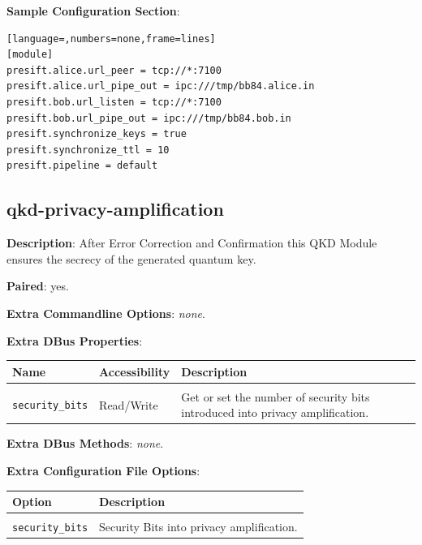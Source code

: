 \bigskip

\noindent \textbf{Sample Configuration Section}: 

\medskip

\begin{lstlisting}[language=,numbers=none,frame=lines]
[module]
presift.alice.url_peer = tcp://*:7100
presift.alice.url_pipe_out = ipc:///tmp/bb84.alice.in
presift.bob.url_listen = tcp://*:7100
presift.bob.url_pipe_out = ipc:///tmp/bb84.bob.in
presift.synchronize_keys = true
presift.synchronize_ttl = 10
presift.pipeline = default
\end{lstlisting}

\clearpage


\subsection{qkd-privacy-amplification}
\label{subsec:qkd-privacy-amplification}

\textbf{Description}: After Error Correction and Confirmation this QKD Module ensures the secrecy of the generated quantum key.

\bigskip

\noindent \textbf{Paired}: yes.

\bigskip

\noindent \textbf{Extra Commandline Options}: \emph{none}.

\bigskip

\noindent \textbf{Extra DBus Properties}:

\medskip

\begin{tabular}{llp{7cm}}

Name                        & Accessibility &   Description \\
\hline
\\
\texttt{security\_bits}     & Read/Write    &   Get or set the number of security bits introduced into privacy amplification. \\ [0.5em]

\end{tabular}

\bigskip

\noindent \textbf{Extra DBus Methods}: \emph{none}.

\bigskip

\noindent \textbf{Extra Configuration File Options}: 

\medskip

\begin{tabular}{lp{9cm}}

Option                      & Description \\
\hline
\\
\texttt{security\_bits}     & Security Bits into privacy amplification. \\ [0.5em]

\end{tabular}

